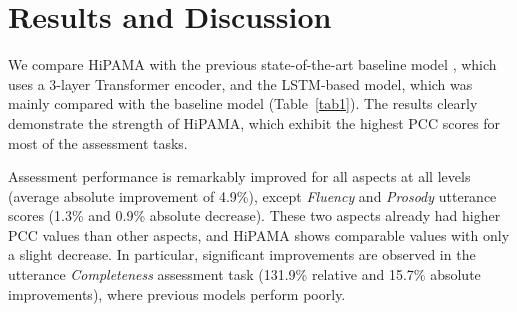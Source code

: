 \documentclass{article}
\begin{document}
\begin{table*}[t]
\centering
{}
\caption{\label{tab2}
Ablation results with average MSE (for phoneme level) and PCC (for phoneme, word, and utterance level) scores of five different runs. \textbf{Hi} and \textbf{MA} denote hierarchical structure and multi-aspect attention mechanism, respectively.}
\end{table*}

\section{Results and Discussion}
We compare HiPAMA with the previous state-of-the-art baseline model \cite{gong2022transformer}, which uses a 3-layer Transformer encoder, and the LSTM-based model, which was mainly compared with the baseline model (Table~\ref{tab1}). The results clearly demonstrate the strength of HiPAMA, which exhibit the highest PCC scores for most of the assessment tasks.

Assessment performance is remarkably improved for all aspects at all levels (average absolute improvement of 4.9\%), except \textit{Fluency} and \textit{Prosody} utterance scores (1.3\% and 0.9\% absolute decrease). These two aspects already had higher PCC values than other aspects, and HiPAMA shows comparable values with only a slight decrease. In particular, significant improvements are observed in the utterance \textit{Completeness} assessment task (131.9\% relative and 15.7\% absolute improvements), where previous models perform poorly.
\end{document}
